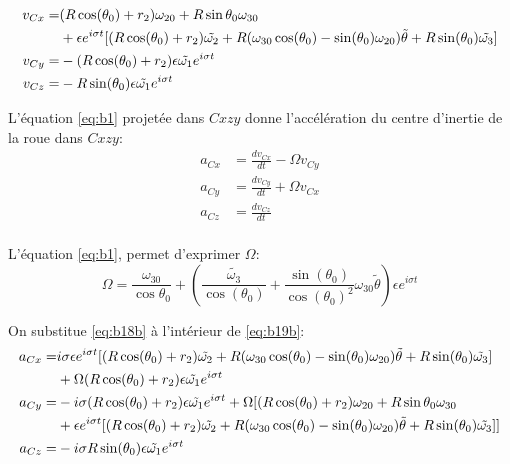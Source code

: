 \begin{align}
    v_{Cx}=&(R\cos(\theta_0)+r_2)\omega_{20}+R \sin{\theta_0}\omega_{30} \nonumber\\ 
    &+ \epsilon e^{i \sigma t}[(R\cos(\theta_0)+r_2) \Tilde{\omega_2} +R(\omega_{30}\cos(\theta_0)-\sin(\theta_0)\omega_{20}) \Tilde{\theta}+R\sin(\theta_0) \Tilde{\omega_3} ] \nonumber\\ 
    v_{Cy} =& -(R\cos(\theta_0)+r_2)\epsilon \Tilde{\omega_1} e^{i \sigma t} \nonumber\\ 
    v_{Cz} =& -R \sin(\theta_0)\epsilon \Tilde{\omega_1} e^{i \sigma t}
  \label{eq:b18b}
\end{align}

L'équation \ref{eq:b1} projetée dans $C{xzy}$ donne l'accélération du centre d'inertie de la roue dans $C{xzy}$:
\begin{align}
    a_{Cx}&=\frac{dv_{Cx}}{dt}-\Omega v_{Cy} \nonumber\\
    a_{Cy}&=\frac{dv_{Cy}}{dt} + \Omega v_{Cx}\nonumber\\
    a_{Cz}&=\frac{dv_{Cz}}{dt} 
  \label{eq:b19b}
\end{align}
\\
L'équation \ref{eq:b1}, permet d'exprimer $\Omega$:
\begin{equation}
    \Omega=\frac{\omega_{30}}{\cos{\theta_0}} + (\frac{\tilde{\omega_3}}{\cos(\theta_0)}+\frac{\sin(\theta_0)}{\cos(\theta_0)^2}\omega_{30}\tilde{\theta})\epsilon e^{i \sigma t}
    \label{eq:Omega}
\end{equation}


On substitue \ref{eq:b18b} à l'intérieur de \ref{eq:b19b}:
\begin{align}
    a_{Cx}=& i \sigma \epsilon e^{i \sigma t}[(R\cos(\theta_0)+r_2) \Tilde{\omega_2} +R(\omega_{30}\cos(\theta_0)-\sin(\theta_0)\omega_{20}) \Tilde{\theta}+R\sin(\theta_0) \Tilde{\omega_3} ] \nonumber\\
    &+\Omega (R\cos(\theta_0)+r_2)\epsilon \Tilde{\omega_1} e^{i \sigma t} \nonumber\\
    a_{Cy}=& -i \sigma( R\cos(\theta_0)+r_2)\epsilon \Tilde{\omega_1} e^{i \sigma t} 
    + \Omega [(R\cos(\theta_0)+r_2)\omega_{20}+R \sin{\theta_0}\omega_{30} \nonumber\\ 
    &+ \epsilon e^{i \sigma t}[(R\cos(\theta_0)+r_2) \Tilde{\omega_2} +R(\omega_{30}\cos(\theta_0)-\sin(\theta_0)\omega_{20}) \Tilde{\theta}+R\sin(\theta_0) \Tilde{\omega_3} ] ]\nonumber \\
    a_{Cz}=& -i \sigma R \sin(\theta_0)\epsilon \Tilde{\omega_1} e^{i \sigma t} 
  \label{eq:b19b2}
\end{align}

